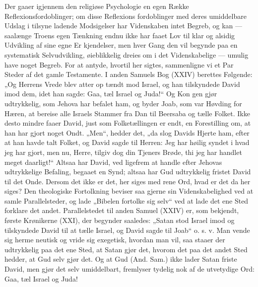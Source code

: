 \documentclass[12pt]{book}
\newcommand{\opage}[1]{\marginnote{\footnotesize\textit{[#1]}}}
\begin{document}
Der gaaer igjennem den religiøse Psychologie en
egen Række Reflexionsfordoblinger; om disse Reflexions\-%
fordoblinger med deres umiddelbare Udslag i tilsyne\-%
ladende Modsigelser har Videnskaben intet Begreb, og
kan --- saalænge Troens egen Tænkning endnu ikke har
faaet Lov til klar og alsidig Udvikling af sine egne Er\-%
kjendelser, men hver Gang den vil begynde paa en
systematisk Selvudvikling, øieblikkelig dreies om i det
Videnskabelige --- umulig have noget Begreb. For at
antyde, hvortil her sigtes, sammenligne vi et Par Steder
af det gamle Testamente. I anden Samuels Bog (XXIV)
berettes Følgende: „Og Herrens Vrede blev atter op\-%
tændt mod Israel, og han tilskyndede David imod dem,
idet han sagde: Gaa, tæl Israel og Juda!“ Og Kon\-%
gen gjør udtrykkelig, som Jehova har befalet ham, og
byder Joab, som var Høvding for Hæren, at bereise alle
Israels Stammer fra Dan til Beersaba og tælle Folket.
Ikke desto mindre faaer David, just som Folketællingen
er endt, en Forestilling om, at han har gjort noget Ondt.
„Men“, hedder det, „da slog Davids Hjerte ham, efter
at han havde talt Folket, og David sagde til Herren:
Jeg har høilig syndet i hvad jeg har gjort, men nu,
Herre, tilgiv dog din Tjeners Brøde, thi jeg har handlet
meget daarligt!“ Altsaa har David, ved ligefrem at
handle efter Jehovas udtrykkelige Befaling, begaaet en
Synd; altsaa har Gud udtrykkelig fristet David til det
Onde. Dersom det ikke er det, her siges med rene Ord,
hvad er det da her siges? Den theologiske Fortolkning
beviser saa gjerne sin Videnskabelighed ved at samle
Parallelsteder, og lade „Bibelen fortolke sig selv“ ved
at lade det ene Sted forklare det andet. Parallelstedet
til anden Samuel (XXIV) er, som bekjendt, første
\opage{87}\setcounter{footnote}{0}%
Krønikerne (XXI), der begynder saaledes: „Satan stod
Israel imod og tilskyndede David til at tælle Israel, og
David sagde til Joab“ o. s. v. Man vende sig herme\-%
neutisk og vride sig exegetisk, hvordan man vil, saa
staaer der udtrykkelig paa det ene Sted, at Satan gjør
det, hvorom det paa det andet Sted hedder, at Gud selv
gjør det. Og at Gud (And. Sam.) ikke lader Satan
friste David, men gjør det selv umiddelbart, fremlyser
tydelig nok af de utvetydige Ord: Gaa, tæl Israel og
Juda!
\end{document}
